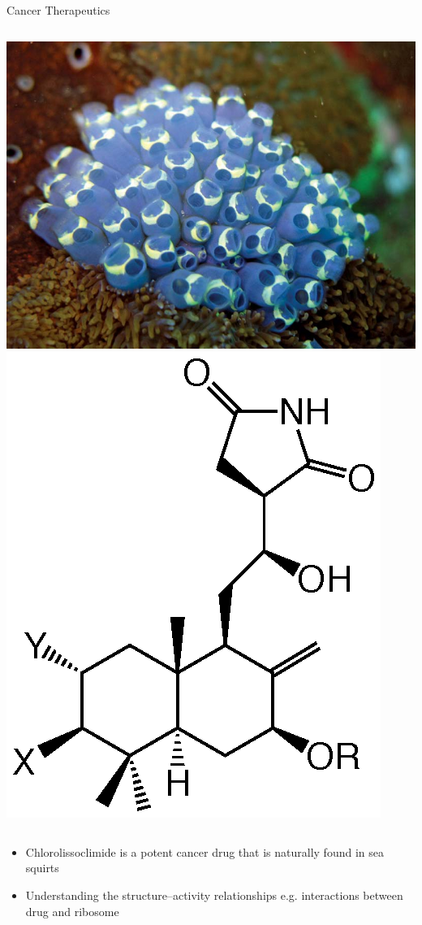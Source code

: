 \documentclass[11pt]{beamer}
\begin{document}
\begin{frame}{Cancer Therapeutics}
  \vspace*{0.5cm}
  \begin{columns}
    \centering
    \includegraphics[width=0.7\linewidth]{sea_squirt}
    \hspace*{-1cm}
    \includegraphics[width=0.4\linewidth]{lisso_struct}
    \begin{table}
    \end{table}
  \end{columns}

  \begin{itemize}
  \item Chlorolissoclimide is a potent cancer drug that
    is naturally found in sea squirts
  \item Understanding the structure--activity relationships
    e.g. interactions between drug and ribosome
  \end{itemize}
\end{frame}
\end{document}

